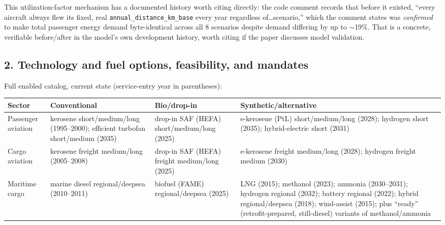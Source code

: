 \documentclass{article}
\begin{document}
This utilization-factor mechanism has a documented history worth citing
directly: the code comment records that before it existed, ``every aircraft
always flew its fixed, real \verb|annual_distance_km_base| every year
regardless of\ldots scenario,'' which the comment states was
\emph{confirmed} to make total passenger energy demand byte-identical
across all 8 scenarios despite demand differing by up to $\sim$19\%. That is
a concrete, verifiable before/after in the model's own development history,
worth citing if the paper discusses model validation.

\subsection*{2. Technology and fuel options, feasibility, and mandates}

Full enabled catalog, current state (service-entry year in parentheses):

\begin{longtable}{p{2.6cm}p{3.4cm}p{3.4cm}p{5.6cm}}
\textbf{Sector} & \textbf{Conventional} & \textbf{Bio/drop-in} & \textbf{Synthetic/alternative} \\
\hline
\endhead
Passenger aviation &
  kerosene short/medium/long (1995--2000); efficient turbofan short/medium (2035) &
  drop-in SAF (HEFA) short/medium/long (2025) &
  e-kerosene (PtL) short/medium/long (2028); hydrogen short (2035); hybrid-electric short (2031) \\
Cargo aviation &
  kerosene freight medium/long (2005--2008) &
  drop-in SAF (HEFA) freight medium/long (2025) &
  e-kerosene freight medium/long (2028); hydrogen freight medium (2030) \\
Maritime cargo &
  marine diesel regional/deepsea (2010--2011) &
  biofuel (FAME) regional/deepsea (2025) &
  LNG (2015); methanol (2023); ammonia (2030--2031); hydrogen regional (2032); battery regional (2022); hybrid regional/deepsea (2018); wind-assist (2015); plus ``ready'' (retrofit-prepared, still-diesel) variants of methanol/ammonia \\
\end{longtable}
\end{document}
